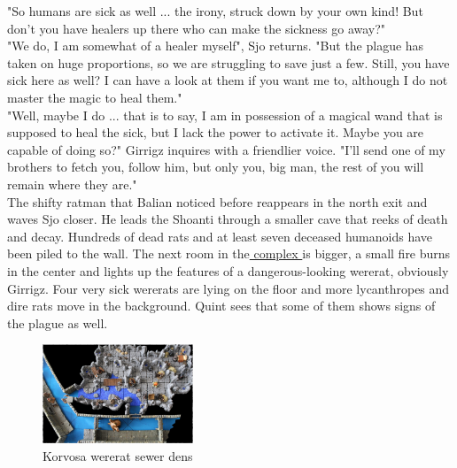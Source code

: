 "So humans are sick as well ... the irony, struck down by your own kind! But don't you have healers up there who can make the sickness go away?"\\

"We do, I am somewhat of a healer myself", Sjo returns. "But the plague has taken on huge proportions, so we are struggling to save just a few. Still, you have sick here as well? I can have a look at them if you want me to, although I do not master the magic to heal them."\\

"Well, maybe I do ... that is to say, I am in possession of a magical wand that is supposed to heal the sick, but I lack the power to activate it. Maybe you are capable of doing so?" Girrigz inquires with a friendlier voice. "I'll send one of my brothers to fetch you, follow him, but only you, big man, the rest of you will remain where they are."\\

The shifty ratman that Balian noticed before reappears in the north exit and waves Sjo closer. He leads the Shoanti through a smaller cave that reeks of death and decay. Hundreds of dead rats and at least seven deceased humanoids have been piled to the wall. The next room in the\hyperref[fig:Korvosa-wererat-sewer-dens-503381693]{ complex } is bigger, a small fire burns in the center and lights up the features of a dangerous-looking wererat, obviously Girrigz. Four very sick wererats are lying on the floor and more lycanthropes and dire rats move in the background. Quint sees that some of them shows signs of the plague as well. \\

\begin{figure}[h]
	\centering
	\includegraphics[width=0.4\textwidth]{images/Korvosa-wererat-sewer-dens-503381693_mod.jpg}
	\caption{Korvosa wererat sewer dens}
	\label{fig:Korvosa-wererat-sewer-dens-503381693}
\end{figure}

